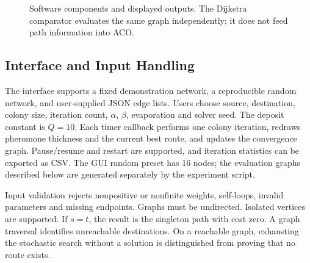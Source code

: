 \documentclass[conference]{IEEEtran}
\begin{document}
\begin{figure}[tb]
\centering
{}
\caption{Software components and displayed outputs. The Dijkstra comparator evaluates the same graph independently; it does not feed path information into ACO.}
\label{fig:architecture}
\end{figure}

\subsection{Interface and Input Handling}
The interface supports a fixed demonstration network, a reproducible random network, and user-supplied JSON edge lists. Users choose source, destination, colony size, iteration count, $\alpha$, $\beta$, evaporation and solver seed. The deposit constant is $Q=10$. Each timer callback performs one colony iteration, redraws pheromone thickness and the current best route, and updates the convergence graph. Pause/resume and restart are supported, and iteration statistics can be exported as CSV. The GUI random preset has 16 nodes; the evaluation graphs described below are generated separately by the experiment script.

Input validation rejects nonpositive or nonfinite weights, self-loops, invalid parameters and missing endpoints. Graphs must be undirected. Isolated vertices are supported. If $s=t$, the result is the singleton path with cost zero. A graph traversal identifies unreachable destinations. On a reachable graph, exhausting the stochastic search without a solution is distinguished from proving that no route exists.
\end{document}
